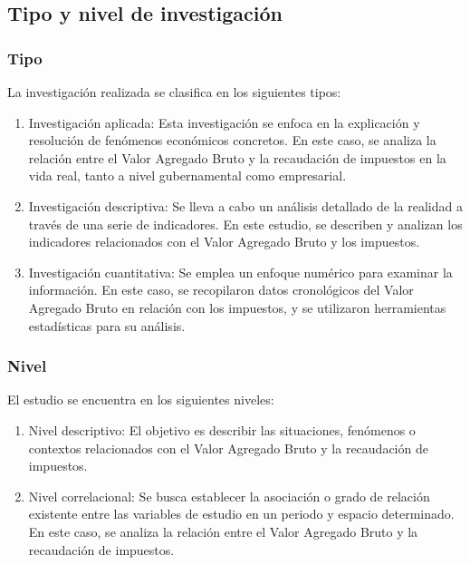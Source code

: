 \documentclass[
  letterpaper,
  DIV=11,
  numbers=noendperiod]{scrartcl}
\begin{document}
\hypertarget{tipo-y-nivel-de-investigaciuxf3n}{%
\subsection{Tipo y nivel de
investigación}\label{tipo-y-nivel-de-investigaciuxf3n}}

\hypertarget{tipo}{%
\subsubsection{Tipo}\label{tipo}}

La investigación realizada se clasifica en los siguientes tipos:

\begin{enumerate}
\def\labelenumi{\alph{enumi}.}
\item
  Investigación aplicada: Esta investigación se enfoca en la explicación
  y resolución de fenómenos económicos concretos. En este caso, se
  analiza la relación entre el Valor Agregado Bruto y la recaudación de
  impuestos en la vida real, tanto a nivel gubernamental como
  empresarial.
\item
  Investigación descriptiva: Se lleva a cabo un análisis detallado de la
  realidad a través de una serie de indicadores. En este estudio, se
  describen y analizan los indicadores relacionados con el Valor
  Agregado Bruto y los impuestos.
\item
  Investigación cuantitativa: Se emplea un enfoque numérico para
  examinar la información. En este caso, se recopilaron datos
  cronológicos del Valor Agregado Bruto en relación con los impuestos, y
  se utilizaron herramientas estadísticas para su análisis.
\end{enumerate}

\hypertarget{nivel}{%
\subsubsection{Nivel}\label{nivel}}

El estudio se encuentra en los siguientes niveles:

\begin{enumerate}
\def\labelenumi{\alph{enumi}.}
\item
  Nivel descriptivo: El objetivo es describir las situaciones, fenómenos
  o contextos relacionados con el Valor Agregado Bruto y la recaudación
  de impuestos.
\item
  Nivel correlacional: Se busca establecer la asociación o grado de
  relación existente entre las variables de estudio en un periodo y
  espacio determinado. En este caso, se analiza la relación entre el
  Valor Agregado Bruto y la recaudación de impuestos.
\end{enumerate}
\end{document}

